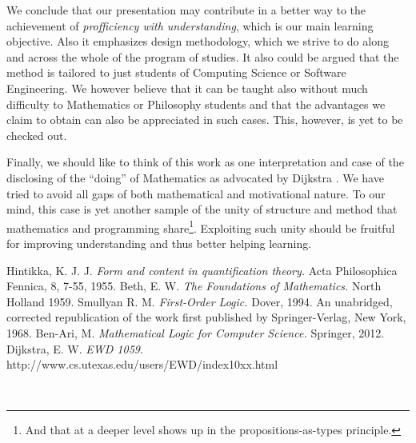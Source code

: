 \documentclass[a4paper,UKenglish]{lipics}
\newcounter{c}
\begin{document}
We conclude that our presentation may contribute in a better way to the achievement of \textit{profficiency with understanding}, which is our main learning objective. Also it emphasizes design methodology, which we strive to do along and across the whole of  the program of studies.
It also could be argued that the method is tailored to just students of Computing Science or Software Engineering. We however believe that it can be taught also without much difficulty to Mathematics or Philosophy students and that the advantages we claim to obtain can also be appreciated in such cases. This, however, is yet to be checked out.

Finally, we should like to think of this work as one interpretation and case of the disclosing of the ``doing'' of Mathematics as advocated by Dijkstra \cite{Dijkstra}. We have tried to avoid all gaps of both mathematical and motivational nature. To our mind, this case is yet another sample of the unity of structure and method that mathematics and programming share\footnote{And that at a deeper level shows up in the propositions-as-types principle.}. Exploiting such unity should be fruitful for improving understanding and thus better helping learning.


\begin{thebibliography}{3}
 Hintikka, K. J. J. \textit{Form and content in quantification theory.} Acta Philosophica Fennica, 8, 7-55, 1955.
 Beth, E. W. \textit{The Foundations of Mathematics.} North Holland 1959.
 Smullyan R. M. \textit{First-Order Logic.} Dover, 1994. An unabridged, corrected republication of the work first published by Springer-Verlag, New York, 1968. 
 Ben-Ari, M. \textit{Mathematical Logic for Computer Science.} Springer, 2012.
 Dijkstra, E. W. \textit{EWD 1059}. http://www.cs.utexas.edu/users/EWD/index10xx.html
\end{thebibliography}

\newpage
\thispagestyle{empty}
{\ }
\end{document}
